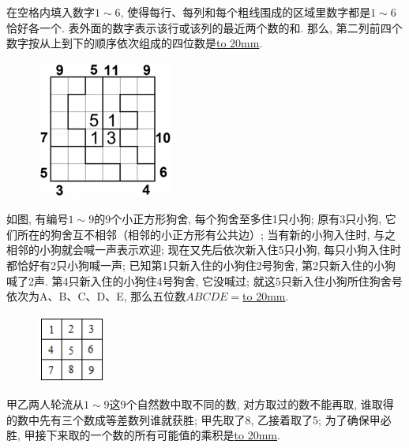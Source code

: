\item {
    在空格内填入数字$1\sim 6$, 使得每行、每列和每个粗线围成的区域里数字都是$1\sim 6$恰好各一个. 表外面的数字表示该行或该列的最近两个数的和. 那么, 第二列前四个数字按从上到下的顺序依次组成的四位数是\underline{\hbox to 20mm{}}.
    \begin{figure}[H] 
        \centering
        \includegraphics[width=0.4\textwidth]{./pics/Chapter_7/2016_1.png}
    \end{figure}
    \vspace{1cm}
}

\item {
    如图, 有编号$1\sim 9$的9个小正方形狗舍, 每个狗舍至多住1只小狗; 原有3只小狗, 它们所在的狗舍互不相邻（相邻的小正方形有公共边）; 当有新的小狗入住时, 与之相邻的小狗就会喊一声表示欢迎; 现在又先后依次新入住5只小狗, 每只小狗入住时都恰好有2只小狗喊一声; 已知第1只新入住的小狗住2号狗舍, 第2只新入住的小狗喊了2声. 第4只新入住的小狗住4号狗舍, 它没喊过; 就这5只新入住小狗所住狗舍号依次为A、B、C、D、E, 那么五位数$ABCDE=$\underline{\hbox to 20mm{}}.
    \begin{figure}[H] 
        \centering
        \includegraphics[width=0.2\textwidth]{./pics/Chapter_7/2016_2.png}
    \end{figure}
    \vspace{1cm}
}

\item {
    甲乙两人轮流从$1\sim 9$这9个自然数中取不同的数, 对方取过的数不能再取, 谁取得的数中先有三个数成等差数列谁就获胜; 甲先取了8, 乙接着取了5; 为了确保甲必胜, 甲接下来取的一个数的所有可能值的乘积是\underline{\hbox to 20mm{}}.
    \vspace{1cm}
}

